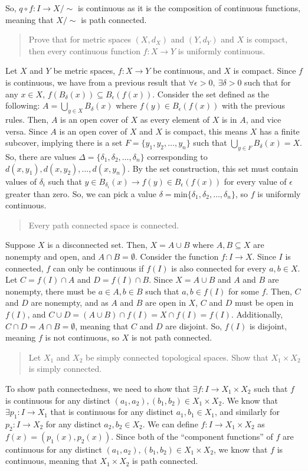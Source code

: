 \documentclass[12pt]{extarticle}
\begin{document}
\noindent So, $q\circ f:I\rightarrow X/\sim$ is continuous as it is the composition of continuous functions, meaning that $X/\sim$ is path connected.
\pagebreak
  \begin{quote}
    Prove that for metric spaces $(X,d_X)$ and $(Y,d_Y)$ and $X$ is compact, then every continuous function $f:X\rightarrow Y$ is uniformly continuous.
  \end{quote}
  Let $X$ and $Y$ be metric spaces, $f:X\rightarrow Y$ be continuous, and $X$ is compact. Since $f$ is continuous, we have from a previous result that $\forall \epsilon>0,~\exists \delta>0$ such that for any $x\in X$, $f(B_{\delta}(x))\subseteq B_{\epsilon}(f(x))$. Consider the set defined as the following: $A = \bigcup_{y\in X}B_{\delta}(x)$ where $f(y)\in B_{\epsilon}(f(x))$ with the previous rules. Then, $A$ is an open cover of $X$ as every element of $X$ is in $A$, and vice versa. Since $A$ is an open cover of $X$ and $X$ is compact, this means $X$ has a finite subcover, implying there is a set $F = \{y_1,y_2,\dots,y_n\}$ such that $\bigcup_{y\in F} B_{\delta}(x) = X$. So, there are values $\Delta = \{\delta_1,\delta_2,\dots,\delta_n\}$ corresponding to $d(x,y_1),d(x,y_2),\dots,d(x,y_n)$. By the set construction, this set must contain values of $\delta_i$ such that $y\in B_{\delta_i}(x) \rightarrow f(y)\in B_{\epsilon}(f(x))$ for every value of $\epsilon$ greater than zero. So, we can pick a value $\delta = \textrm{min}\{\delta_1,\delta_2,\dots,\delta_n\}$, so $f$ is uniformly continuous.
  \begin{quote}
    Every path connected space is connected.
  \end{quote}
Suppose $X$ is a disconnected set. Then, $X = A\cup B$ where $A,B\subseteq X$ are nonempty and open, and $A\cap B = \emptyset$. Consider the function $f:I\rightarrow X$. Since $I$ is connected, $f$ can only be continuous if $f(I)$ is also connected for every $a,b\in X$. Let $C = f(I) \cap A$ and $D = f(I)\cap B$. Since $X = A\cup B$ and $A$ and $B$ are nonempty, there must be $a\in A, b\in B$ such that $a,b\in f(I)$ for some $f$. Then, $C$ and $D$ are nonempty, and as $A$ and $B$ are open in $X$, $C$ and $D$ must be open in $f(I)$, and $C\cup D = (A\cup B)\cap f(I) = X\cap f(I) = f(I)$. Additionally, $C\cap D = A\cap B = \emptyset$, meaning that $C$ and $D$ are disjoint. So, $f(I)$ is disjoint, meaning $f$ is not continuous, so $X$ is not path connected.
  \begin{quote}
    Let $X_1$ and $X_2$ be simply connected topological spaces. Show that $X_1\times X_2$ is simply connected.
  \end{quote}
To show path connectedness, we need to show that $\exists f:I\rightarrow X_1\times X_2$ such that $f$ is continuous for any distinct $(a_1,a_2),(b_1,b_2)\in X_1\times X_2$. We know that $\exists p_1:I\rightarrow X_1$ that is continuous for any distinct $a_1,b_1\in X_1$, and similarly for $p_2:I\rightarrow X_2$ for any distinct $a_2,b_2\in X_2$. We can define $f:I\rightarrow X_1\times X_2$ as $f(x) = (p_1(x),p_2(x))$. Since both of the ``component functions'' of $f$ are continuous for any distinct $(a_1,a_2),(b_1,b_2)\in X_1\times X_2$, we know that $f$ is continuous, meaning that $X_1\times X_2$ is path connected.\\
\end{document}
